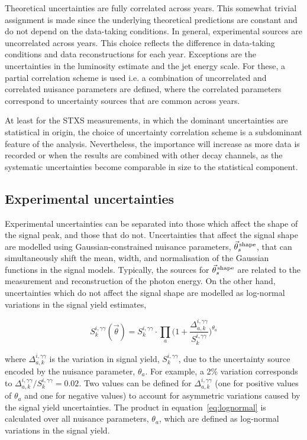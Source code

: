 Theoretical uncertainties are fully correlated across years. This somewhat trivial assignment is made since the underlying theoretical predictions are constant and do not depend on the data-taking conditions. In general, experimental sources are uncorrelated across years. This choice reflects the difference in data-taking conditions and data reconstructions for each year. Exceptions are the uncertainties in the luminosity estimate and the jet energy scale. For these, a partial correlation scheme is used i.e. a combination of uncorrelated and correlated nuisance parameters are defined, where the correlated parameters correspond to uncertainty sources that are common across years.

At least for the STXS measurements, in which the dominant uncertainties are statistical in origin, the choice of uncertainty correlation scheme is a subdominant feature of the analysis. Nevertheless, the importance will increase as more data is recorded or when the results are combined with other decay channels, as the systematic uncertainties become comparable in size to the statistical component.

\subsection{Experimental uncertainties}\label{sec:systematics_experimental}
Experimental uncertainties can be separated into those which affect the shape of the signal \mgg peak, and those that do not. Uncertainties that affect the signal shape are modelled using Gaussian-constrained nuisance parameters, $\vec{\theta}^{\,\rm{shape}}_{s}$, that can simultaneously shift the mean, width, and normalisation of the Gaussian functions in the signal models. Typically, the sources for $\vec{\theta}^{\,\rm{shape}}_{s}$ are related to the measurement and reconstruction of the photon energy. On the other hand, uncertainties which do not affect the signal shape are modelled as log-normal variations in the signal yield estimates,

\begin{equation}\label{eq:lognormal}
    S^{i,\gamma\gamma}_k(\vec{\theta}) = S^{i,\gamma\gamma}_k \cdot \prod_a \Big( 1+\frac{\Delta^{i,\gamma\gamma}_{a,k}}{S^{i,\gamma\gamma}_k} \Big)^{\theta_a}
\end{equation}

\noindent
where $\Delta^{i,\gamma\gamma}_{a,k}$ is the variation in signal yield, $S^{i,\gamma\gamma}_k$, due to the uncertainty source encoded by the nuisance parameter, $\theta_a$. For example, a 2\% variation corresponds to ${\Delta^{i,\gamma\gamma}_{a,k}/S^{i,\gamma\gamma}_k=0.02}$. Two values can be defined for $\Delta^{i,\gamma\gamma}_{a,k}$ (one for positive values of $\theta_a$ and one for negative values) to account for asymmetric variations caused by the signal yield uncertainties. The product in equation~\ref{eq:lognormal} is calculated over all nuisance parameters, $\theta_a$, which are defined as log-normal variations in the signal yield.

